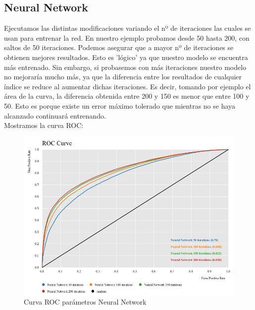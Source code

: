 	\subsection{Neural Network}
	
	\hspace{1cm} Ejecutamos las distintas modificaciones variando el nº de iteraciones las cuales se usan para entrenar la red. En nuestro ejemplo probamos desde 50 hasta 200, con saltos de 50 iteraciones. Podemos asegurar que a mayor nº de iteraciones se obtienen mejores resultados. Esto es 'lógico' ya que nuestro modelo se encuentra más entrenado. Sin embargo, si probasemos con más iteraciones nuestro modelo no mejoraría mucho más, ya que la diferencia entre los resultados de cualquier índice se reduce al aumentar dichas iteraciones. Es decir, tomando por ejemplo el área de la curva, la diferencia obtenida entre 200 y 150 es menor que entre 100 y 50. Esto es porque existe un error máximo tolerado que mientras no se haya alcanzado continuará entrenando. \\
	
	Mostramos la curva ROC:
	\begin{figure}[H]
		\centering
		\includegraphics[width=1\textwidth]{img/nnall.png}
		\caption{Curva ROC parámetros Neural Network}
	\end{figure}
	

